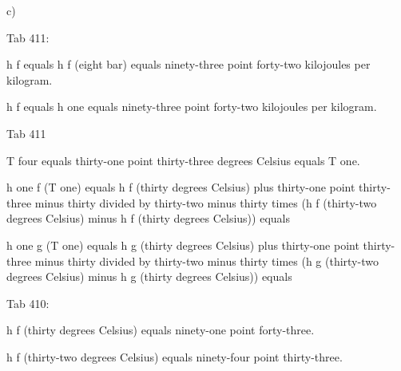 c)

Tab 411:

h f equals h f (eight bar) equals ninety-three point forty-two kilojoules per kilogram.

h f equals h one equals ninety-three point forty-two kilojoules per kilogram.

Tab 411

T four equals thirty-one point thirty-three degrees Celsius equals T one.

h one f (T one) equals h f (thirty degrees Celsius) plus thirty-one point thirty-three minus thirty divided by thirty-two minus thirty times (h f (thirty-two degrees Celsius) minus h f (thirty degrees Celsius)) equals

h one g (T one) equals h g (thirty degrees Celsius) plus thirty-one point thirty-three minus thirty divided by thirty-two minus thirty times (h g (thirty-two degrees Celsius) minus h g (thirty degrees Celsius)) equals

Tab 410:

h f (thirty degrees Celsius) equals ninety-one point forty-three.

h f (thirty-two degrees Celsius) equals ninety-four point thirty-three.